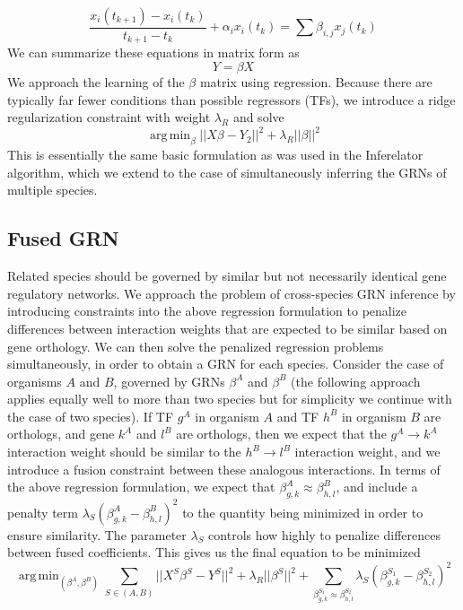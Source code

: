 \documentclass[11pt]{article}
\DeclareMathOperator*{\argmin}{arg\,min}
\begin{document}
\begin{equation}
\frac{x_i(t_{k+1})-x_i(t_k)}{t_{k+1}-t_k} + \alpha_{i}x_{i}(t_k)= \sum \beta_{i,j}x_{j}(t_k)
\end{equation}
\noindent We can summarize these equations in matrix form as
\begin{equation}
Y = \beta X
\end{equation}
\noindent We approach the learning of the $\beta$ matrix using regression. Because there are typically far fewer conditions than possible regressors (TFs), we introduce a ridge regularization constraint with weight $\lambda_R$ and solve
\begin{equation}
\argmin_\beta\vert \vert X\beta - Y_2 \vert \vert ^2 + \lambda_R \vert \vert \beta \vert \vert ^2
\end{equation}
This is essentially the same basic formulation as was used in the Inferelator algorithm, which we extend to the case of simultaneously inferring the GRNs of multiple species. 

\subsection{Fused GRN}
Related species should be governed by similar but not necessarily identical gene regulatory networks. We approach the problem of cross-species GRN inference by introducing constraints into the above regression formulation to penalize differences between interaction weights that are expected to be similar based on gene orthology. We can then solve the penalized regression problems simultaneously, in order to obtain a GRN for each species. Consider the case of organisms $A$ and $B$, governed by GRNs $\beta^A$ and $\beta^B$ (the following approach applies equally well to more than two species but for simplicity we continue with the case of two species). If TF $g^A$ in organism $A$ and TF $h^B$ in organism $B$ are orthologs, and gene $k^A$ and $l^B$ are orthologs, then we expect that the $g^A \rightarrow k^A$ interaction weight should be similar to the $h^B \rightarrow l^B$ interaction weight, and we introduce a fusion constraint between these analogous interactions. In terms of the above regression formulation, we expect that $\beta^A_{g,k} \approx \beta^B_{h,l}$, and include a penalty term $\lambda_S(\beta^A_{g,k} - \beta^B_{h,l})^2$ to the quantity being minimized in order to ensure similarity. The parameter $\lambda_S$ controls how highly to penalize differences between fused coefficients. This gives us the final equation to be minimized 
\begin{equation}
\argmin_{(\beta^A, \beta^B)} \displaystyle\sum_{S \in (A, B)} \vert \vert X^S\beta^S - Y^S \vert \vert ^2 + \lambda_R \vert \vert \beta^S \vert \vert ^2 + \displaystyle \sum_{\beta^{S_1}_{g,k} \approx \beta^{S_2}_{h,l}} \lambda_S(\beta^{S_1}_{g,k} - \beta^{S_2}_{h,l})^2
\end{equation}
\end{document}
